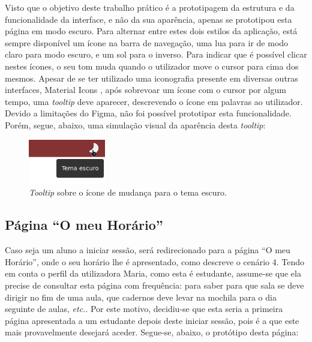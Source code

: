 \documentclass[12pt, a4paper]{article}
\begin{document}
Visto que o objetivo deste trabalho prático é a prototipagem da estrutura e da funcionalidade da
interface, e não da sua aparência, apenas se prototipou esta página em modo escuro. Para alternar
entre estes dois estilos da aplicação, está sempre disponível um ícone na barra de navegação, uma
lua para ir de modo claro para modo escuro, e um sol para o inverso. Para indicar que é possível
clicar nestes ícones, o seu tom muda quando o utilizador move o cursor para cima dos mesmos. Apesar
de se ter utilizado uma iconografia presente em diversas outras interfaces, Material Icons
\cite{material-icons}, após sobrevoar um ícone com o cursor por algum tempo, uma \emph{tooltip} deve
aparecer, descrevendo o ícone em palavras ao utilizador. Devido a limitações do Figma, não foi
possível prototipar esta funcionalidade. Porém, segue, abaixo, uma simulação visual da aparência
desta \emph{tooltip}:

\begin{figure}[H]
    \centering
    \includegraphics[width=0.3\textwidth]{res/prototype/icon-tooltip.png}
    \caption{\emph{Tooltip} sobre o ícone de mudança para o tema escuro.}
    \label{icon-tooltip}
\end{figure}

\subsection{Página ``O meu Horário''}

Caso seja um aluno a iniciar sessão, será redirecionado para a página ``O meu Horário'', onde o seu
horário lhe é apresentado, como descreve o cenário 4. Tendo em conta o perfil da utilizadora Maria,
como esta é estudante, assume-se que ela precise de consultar esta página com frequência: para saber
para que sala se deve dirigir no fim de uma aula, que cadernos deve levar na mochila para o dia
seguinte de aulas, \emph{etc.}. Por este motivo, decidiu-se que esta seria a primeira página
apresentada a um estudante depois deste iniciar sessão, pois é a que este mais provavelmente
desejará aceder. Segue-se, abaixo, o protótipo desta página:
\end{document}
